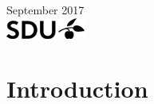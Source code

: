 \documentclass[a4paper]{article}
\theoremstyle{plain}
\begin{document}
\begin{titlepage}


{\large September 2017}\\[2cm] %


\includegraphics{SDU_logo.png}\\[.5cm] %
 

\vfill %

\end{titlepage}
%

%

\clearpage

\tableofcontents

\clearpage


\section{Introduction}
    
    
\end{document}
